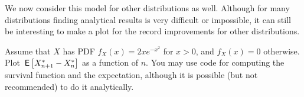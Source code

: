 \documentclass[assignments]{subfiles}
\begin{document}
We now consider this model for other distributions as well. Although for many distributions finding analytical results is very difficult or impossible, it can still be interesting to make a plot for the record improvements for other distributions.




\begin{exercise}
Assume that $X$ has PDF $f_X(x) = 2xe^{-x^2}$ for $x>0$, and $f_X(x) = 0$ otherwise. Plot $\,\mathsf{E}\left[X_{n+1}^* - X_n^*\right]$ as a function of $n$. You may use code for computing the survival function and the expectation, although it is possible (but not recommended) to do it analytically.



\end{exercise}
\end{document}
